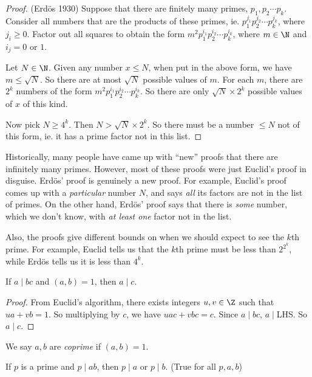 \documentclass[a4paper]{article}
\begin{document}
\begin{proof}
  (Erd\"{o}s 1930) Suppose that there are finitely many primes, $p_1, p_2\cdots p_k$. Consider all numbers that are the products of these primes, ie. $p_1^{j_1}p_2^{j_2}\cdots p_k^{j_k}$, where $j_i \geq 0$. Factor out all squares to obtain the form $m^2p_1^{i_1}p_2^{i_2}\cdots p_k^{i_k}$, where $m\in \N$ and $i_j = 0$ or $1$.

  Let $N\in\N$. Given any number $x \leq N$, when put in the above form, we have $m \leq \sqrt{N}$. So there are at most $\sqrt{N}$ possible values of $m$. For each $m$, there are $2^k$ numbers of the form $m^2p_1^{i_1}p_2^{i_2}\cdots p_k^{i_k}$. So there are only $\sqrt{N}\times 2^k$ possible values of $x$ of this kind.

  Now pick $N\geq 4^k$. Then $N > \sqrt{N}\times 2^k$. So there must be a number $\leq N$ not of this form, ie. it has a prime factor not in this list.
\end{proof}
Historically, many people have came up with ``new'' proofs that there are infinitely many primes. However, most of these proofs were just Euclid's proof in disguise. Erd\"os' proof is genuinely a new proof. For example, Euclid's proof comes up with a \emph{particular} number $N$, and says \emph{all} its factors are not in the list of primes. On the other hand, Erd\"os' proof says that there is \emph{some} number, which we don't know, with \emph{at least one} factor not in the list.

Also, the proofs give different bounds on when we should expect to see the $k$th prime. For example, Euclid tells us that the $k$th prime must be less than $2^{2^k}$, while Erd\"os tells us it is less than $4^k$.

\begin{thm}
  If $a\mid bc$ and $(a, b) = 1$, then $a \mid c$.
\end{thm}

\begin{proof}
  From Euclid's algorithm, there exists integers $u, v\in \Z$ such that $ua + vb = 1$. So multiplying by $c$, we have $uac + vbc = c$. Since $a \mid bc$, $a \mid $LHS. So $a \mid c$.
\end{proof}

\begin{defi}
  We say $a, b$ are \emph{coprime} if $(a, b) = 1$.
\end{defi}

\begin{cor}
  If $p$ is a prime and $p\mid ab$, then $p\mid a$ or $p\mid b$. (True for all $p, a, b$)
\end{cor}
\end{document}
